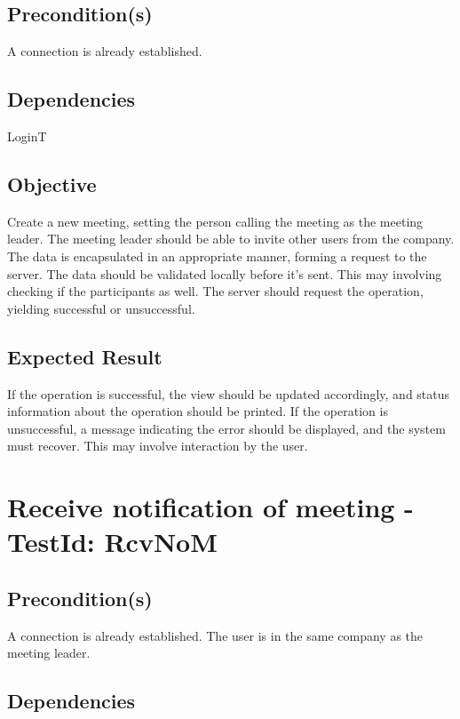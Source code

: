 \documentclass{article}
\begin{document}
\subsection{Precondition(s)}

A connection is already established.

\subsection{Dependencies}

LoginT

\subsection{Objective}

Create a new meeting, setting the person calling the meeting as the meeting
leader. The meeting leader should be able to invite other users from the
company. The data is encapsulated in an appropriate manner, forming a
request to the server. The data should be validated locally before it's
sent. This may involving checking if the participants as well. The server
should request the operation, yielding successful or unsuccessful.

\subsection{Expected Result}

If the operation is successful, the view should be updated accordingly, and
status information about the operation should be printed. \bigskip If the
operation is unsuccessful, a message indicating the error should be
displayed, and the system must recover. This may involve interaction by the
user. \newpage

\section{Receive notification of meeting - TestId: RcvNoM}

\subsection{Precondition(s)}

A connection is already established. The user is in the same company as the
meeting leader.

\subsection{Dependencies}
\end{document}
